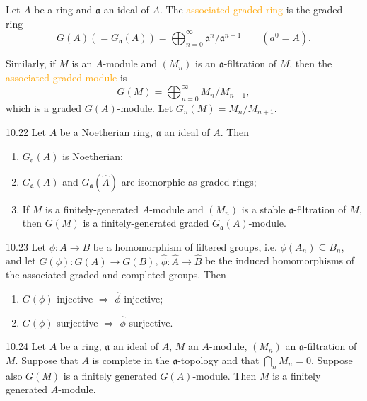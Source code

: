 Let $A$ be a ring and $\mathfrak{a}$ an ideal of $A$. The \textcolor{orange}{associated graded ring} is the graded ring
\begin{equation*}
	G(A)\left(=G_\mathfrak{a}(A)\right)=\bigoplus_{n=0}^\infty\mathfrak{a}^n/\mathfrak{a}^{n+1}\qquad(a^0=A).
\end{equation*}

Similarly, if $M$ is an $A$-module and $\left(M_n\right)$ is an $\mathfrak{a}$-filtration of $M$, then the \textcolor{orange}{associated graded module} is
\begin{equation*}
	G(M)=\bigoplus_{n=0}^\infty M_n/M_{n+1},
\end{equation*}
which is a graded $G(A)$-module. Let $G_n(M)=M_n/M_{n+1}$.

\begin{proposition}{10.22}
	Let $A$ be a Noetherian ring, $\mathfrak{a}$ an ideal of $A$. Then
	\begin{enumerate}[label=\textup{(\roman*)},ref=\thepropositiontemp(\roman*)]
		\item\label{10.22.1} $G_\mathfrak{a}(A)$ is Noetherian;
		\item\label{10.22.2} $G_\mathfrak{a}(A)$ and $G_{\hat{\mathfrak{a}}}(\hat{A})$ are isomorphic as graded rings;
		\item\label{10.22.3} If $M$ is a finitely-generated $A$-module and $\left(M_n\right)$ is a stable $\mathfrak{a}$-filtration of $M$, then $G(M)$ is a finitely-generated graded $G_\mathfrak{a}(A)$-module.
	\end{enumerate}
\end{proposition}

\begin{proposition}{10.23}
	Let $\phi:A\rightarrow B$ be a homomorphism of filtered groups, i.e. $\phi(A_n)\subseteq B_n$, and let $G(\phi):G(A)\rightarrow G(B)$, $\hat{\phi}:\hat{A}\rightarrow\hat{B}$ be the induced homomorphisms of the associated graded and completed groups. Then
	\begin{enumerate}[label=\textup{(\roman*)}]
		\item $G(\phi)$ injective $\Rightarrow$ $\hat{\phi}$ injective;
		\item $G(\phi)$ surjective $\Rightarrow$ $\hat{\phi}$ surjective.
	\end{enumerate}
\end{proposition}

\begin{proposition}{10.24}
	Let $A$ be a ring, $\mathfrak{a}$ an ideal of $A$, $M$ an $A$-module, $\left(M_n\right)$ an $\mathfrak{a}$-filtration of $M$. Suppose that $A$ is complete in the $\mathfrak{a}$-topology and that $\bigcap_nM_n=0$. Suppose also $G(M)$ is a finitely generated $G(A)$-module. Then $M$ is a finitely generated $A$-module.
\end{proposition}

